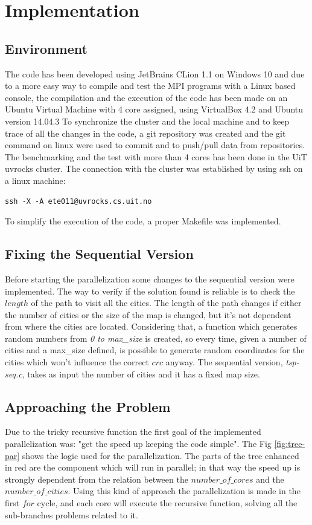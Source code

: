 \documentclass[11pt,conference]{IEEEtran}
\begin{document}
\section{Implementation}
\subsection{Environment}
The code has been developed using JetBrains CLion 1.1 on Windows 10 and due to a more easy way to compile and test the MPI programs with a Linux based console, the compilation and the execution of the code has been made on an Ubuntu Virtual Machine with 4 core assigned, using VirtualBox 4.2 and Ubuntu version 14.04.3
\newline
To synchronize the cluster and the local machine and to keep trace of all the changes in the code, a git repository was created and the git command on linux were used to commit and to push/pull data from repositories.
\newline
The benchmarking and the test with more than 4 cores has been done in the UiT uvrocks cluster. The connection with the cluster was established by using ssh on a linux machine:
\begin{lstlisting}
ssh -X -A ete011@uvrocks.cs.uit.no
\end{lstlisting}
To simplify the execution of the code, a proper Makefile was implemented.

\subsection{Fixing the Sequential Version}
Before starting the parallelization some changes to the sequential version were implemented. The way to verify if the solution found is reliable is to check the $length$ of the path to visit all the cities. The length of the path changes if either the number of cities or the size of the map is changed, but it's not dependent from where the cities are located. Considering that, a function which generates random numbers from \textit{0 to max\_size} is created, so every time, given a number of cities and a max\_size defined, is possible to generate random coordinates for the cities which won't influence the correct $crc$ anyway.
The sequential version, \textit{tsp-seq.c}, takes as input the number of cities and it has a fixed map size.

\subsection{Approaching the Problem}
Due to the tricky recursive function the first goal of the implemented parallelization was: "get the speed up keeping the code simple". 
The Fig \ref{fig:tree-par} shows the logic used for the parallelization. The parts of the tree enhanced in red are the component which will run in parallel; in that way the speed up is strongly dependent from the relation between the $number\_of\_cores$ and the $number\_of\_cities$. Using this kind of approach the parallelization is made in the first $for$ cycle, and each core will execute the recursive function, solving all the sub-branches problems related to it.
\end{document}
